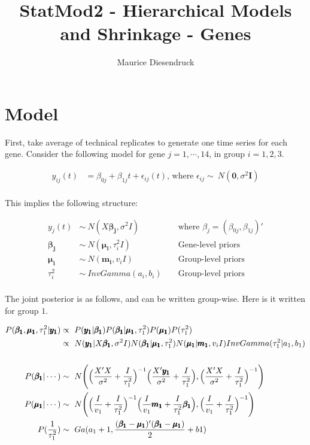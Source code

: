 \documentclass[12pt,letterpaper]{article}\usepackage[]{graphicx}\usepackage[]{color}
\author{Maurice Diesendruck\vspace{-2ex}}
\title{StatMod2 - Hierarchical Models and Shrinkage - Genes\vspace{-1ex}}
\begin{document}
\maketitle

\section{Model}
First, take average of technical replicates to generate one time series for each
gene. Consider the following model for gene $j=1,\cdots,14$, in group $i=1,2,3$.

\begin{align*}
y_{ij}(t) &= \beta_{0j}+\beta_{1j}t + \epsilon_{ij}(t) \text{, where } 
  \epsilon_{ij} \sim\ N(\pmb{0}, \sigma^2\pmb{I})\\
\end{align*}

This implies the following structure:

\begin{align*}
y_j(t) &\sim\ N(X\pmb{\beta_j}, \sigma^2 I) &&\text{ where } 
  \beta_j=(\beta_{0j}, \beta_{1j})'\\
\pmb{\beta_j} &\sim\ N(\pmb{\mu_{i}}, \tau_{i}^2I) 
  &&\text{ Gene-level priors}\\
\pmb{\mu_{i}} &\sim\ N(\pmb{m_{i}}, v_{i}I)
  &&\text{ Group-level priors}\\
\tau_{i}^2 &\sim\ InvGamma(a_{i}, b_{i})
  &&\text{ Group-level priors}\\
\end{align*}

The joint posterior is as follows, and can be written group-wise. Here is it
written for group $1$.

\begin{align*}
P(\pmb{\beta_1},\pmb{\mu_1},\tau_{1}^2|\pmb{y_1}) &\propto\ 
  P(\pmb{y_1}|\pmb{\beta_1})P(\pmb{\beta_1}|\pmb{\mu_1},\tau_{1}^2)P(\pmb{\mu_1})
  P(\tau_{1}^2)\\
&\propto\ N(\pmb{y_1}|X\pmb{\beta_1}, \sigma^2 I)
  N(\pmb{\beta_1}|\pmb{\mu_1},\tau_1^2) N(\pmb{\mu_1}|\pmb{m_1},v_{i}I)
  InvGamma(\tau_{1}^2|a_1,b_1)\\
\vspace{3mm}\\
P(\pmb{\beta_1}|\cdots) &\sim\ N \Bigg( 
  \Big(\frac{X'X}{\sigma^2}+\frac{I}{\tau_1^2} \Big)^{-1}
  \Big(\frac{X'\pmb{y_1}}{\sigma^2}+\frac{I}{\tau_1^2} \Big),
  \Big(\frac{X'X}{\sigma^2}+\frac{I}{\tau_1^2} \Big)^{-1} 
  \Bigg)\\
P(\pmb{\mu_1}|\cdots) &\sim\ N \Bigg(
  \Big(\frac{I}{v_1}+\frac{I}{\tau_1^2} \Big)^{-1}
  \Big(\frac{I}{v_1}\pmb{m_1}+\frac{I}{\tau_1^2}\pmb{\beta_1} \Big),
  \Big(\frac{I}{v_1}+\frac{I}{\tau_1^2} \Big)^{-1} 
  \Bigg)\\
P(\frac{1}{\tau_1^2}) &\sim\ Ga(a_1 + 1, 
  \frac{(\pmb{\beta_1}-\pmb{\mu_1})'(\pmb{\beta_1}-\pmb{\mu_1})}{2} + b1)\\
\end{align*}
\end{document}
